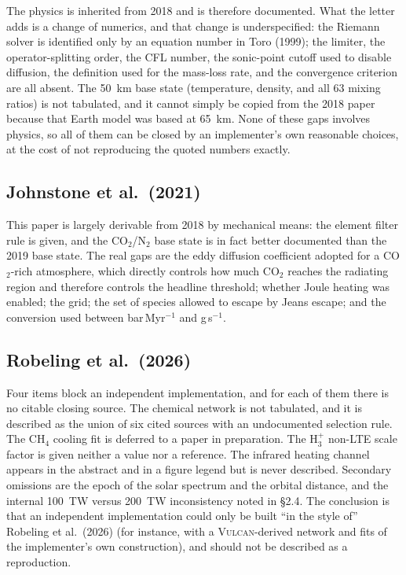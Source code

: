 \documentclass{my_memo}
\newcommand{\gs}{g\,s$^{-1}$}
\begin{document}
The physics is inherited from 2018 and is therefore documented. What the letter adds is a change
of numerics, and that change is underspecified: the Riemann solver is identified only by an
equation number in Toro (1999); the limiter, the operator-splitting order, the CFL number, the
sonic-point cutoff used to disable diffusion, the definition used for the mass-loss rate, and the
convergence criterion are all absent. The 50~km base state (temperature, density, and all 63
mixing ratios) is not tabulated, and it cannot simply be copied from the 2018 paper because
that Earth model was based at 65~km. None of these gaps involves physics, so all of them can be
closed by an implementer's own reasonable choices, at the cost of not reproducing the quoted
numbers exactly.

\subsection{Johnstone et al.\ (2021)}

This paper is largely derivable from 2018 by mechanical means: the element filter rule is given,
and the CO$_2$/N$_2$ base state is in fact better documented than the 2019 base state. The real
gaps are the eddy diffusion coefficient adopted for a CO$_2$-rich atmosphere, which directly
controls how much CO$_2$ reaches the radiating region and therefore controls the headline
threshold; whether Joule heating was enabled; the grid; the set of species allowed to escape by
Jeans escape; and the conversion used between bar\,Myr$^{-1}$ and \gs.

\subsection{Robeling et al.\ (2026)}

Four items block an independent implementation, and for each of them there is no citable closing
source. The chemical network is not tabulated, and it is described as the union of six cited
sources with an undocumented selection rule. The CH$_4$ cooling fit is deferred to a paper in
preparation. The H$_3^+$ non-LTE scale factor is given neither a value nor a reference. The
infrared heating channel appears in the abstract and in a figure legend but is never described.
Secondary omissions are the epoch of the solar spectrum and the orbital distance, and the internal
100~TW versus 200~TW inconsistency noted in \S2.4. The conclusion is that an independent
implementation could only be built ``in the style of'' Robeling et al.\ (2026) (for instance,
with a \textsc{Vulcan}-derived network and fits of the implementer's own construction), and
should not be described as a reproduction.
\end{document}
